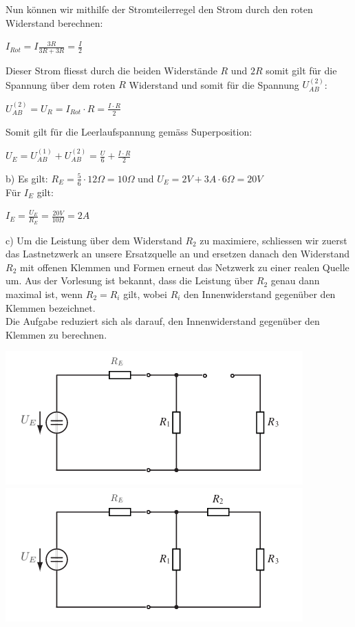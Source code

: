 Nun können wir mithilfe der Stromteilerregel den Strom durch den roten Widerstand berechnen:
\begin{center}
  $I_{Rot} = I \frac{3R}{3R + 3R} = \frac{I}{2}$
\end{center}

Dieser Strom fliesst durch die beiden Widerstände $R$ und $2R$ somit gilt für die Spannung über dem roten $R$ Widerstand und somit für die Spannung $U_{AB}^{(2)}$:
\begin{center}
  $U_{AB}^{(2)}  = U_R = I_{Rot}\cdot R = \frac{I\cdot R}{2}$
\end{center}

\newpage
Somit gilt für die Leerlaufspannung gemäss Superposition:
\begin{center}
  $U_{E} = U_{AB}^{(1)} + U_{AB}^{(2)} = \frac{U}{6} + \frac{I\cdot R}{2}$
\end{center}


b) Es gilt: $R_E = \frac{5}{6} \cdot 12 \Omega = 10\Omega$ und $U_E = 2V + 3A\cdot 6\Omega = 20V$ \\
Für $I_E$ gilt:
\begin{center}
  $I_E = \frac{U_E}{R_E} = \frac{20V}{10\Omega} = 2A$
\end{center}


c) Um die Leistung über dem Widerstand $R_2$ zu maximiere, schliessen wir zuerst das Lastnetzwerk an unsere Ersatzquelle an und ersetzen danach den Widerstand $R_2$ mit offenen Klemmen und Formen erneut das Netzwerk zu einer realen Quelle um. Aus der Vorlesung ist bekannt, dass die Leistung über $R_2$ genau dann maximal ist, wenn $R_2 = R_i$ gilt, wobei $R_i$ den Innenwiderstand gegenüber den Klemmen bezeichnet. \\
Die Aufgabe reduziert sich als darauf, den Innenwiderstand gegenüber den Klemmen zu berechnen.
\begin{center}
        \includegraphics[scale=2.0]{katalog/katalog-1/lr-2.png}
        \includegraphics[scale=2.0]{katalog/katalog-1/lr-1.png}
\end{center}

